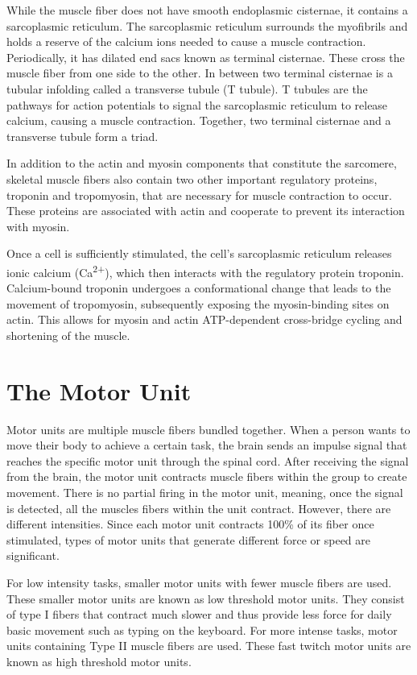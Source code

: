 While the muscle fiber does not have smooth endoplasmic cisternae, it contains a sarcoplasmic reticulum. The sarcoplasmic reticulum surrounds the myofibrils and holds a reserve of the calcium ions needed to cause a muscle contraction. Periodically, it has dilated end sacs known as terminal cisternae. These cross the muscle fiber from one side to the other. In between two terminal cisternae is a tubular infolding called a transverse tubule (T tubule). T tubules are the pathways for action potentials to signal the sarcoplasmic reticulum to release calcium, causing a muscle contraction. Together, two terminal cisternae and a transverse tubule form a triad.

In addition to the actin and myosin components that constitute the sarcomere, skeletal muscle fibers also contain two other important regulatory proteins, troponin and tropomyosin, that are necessary for muscle contraction to occur. These proteins are associated with actin and cooperate to prevent its interaction with myosin.

Once a cell is sufficiently stimulated, the cell's sarcoplasmic reticulum releases ionic calcium (Ca\textsuperscript{2+}), which then interacts with the regulatory protein troponin. Calcium-bound troponin undergoes a conformational change that leads to the movement of tropomyosin, subsequently exposing the myosin-binding sites on actin. This allows for myosin and actin ATP-dependent cross-bridge cycling and shortening of the muscle.

\hypertarget{the-motor-unit}{%
\section{The Motor Unit}\label{the-motor-unit}}

Motor units are multiple muscle fibers bundled together. When a person wants to move their body to achieve a certain task, the brain sends an impulse signal that reaches the specific motor unit through the spinal cord. After receiving the signal from the brain, the motor unit contracts muscle fibers within the group to create movement. There is no partial firing in the motor unit, meaning, once the signal is detected, all the muscles fibers within the unit contract. However, there are different intensities. Since each motor unit contracts 100\% of its fiber once stimulated, types of motor units that generate different force or speed are significant.

For low intensity tasks, smaller motor units with fewer muscle fibers are used. These smaller motor units are known as low threshold motor units. They consist of type I fibers that contract much slower and thus provide less force for daily basic movement such as typing on the keyboard. For more intense tasks, motor units containing Type II muscle fibers are used. These fast twitch motor units are known as high threshold motor units.

